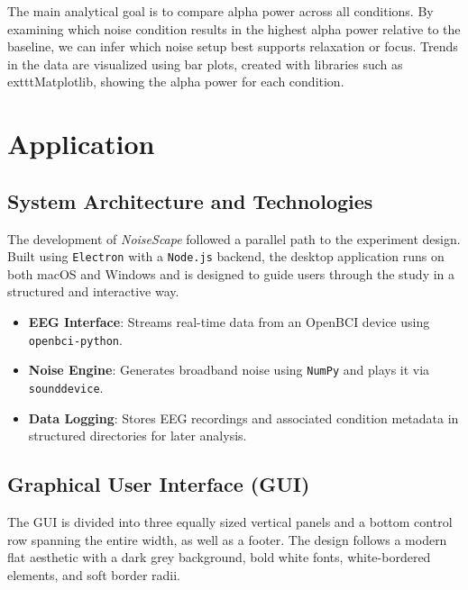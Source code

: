 The main analytical goal is to compare alpha power across all conditions. By examining which noise condition results in the highest alpha power relative to the baseline, we can infer which noise setup best supports relaxation or focus. Trends in the data are visualized using bar plots, created with libraries such as 	exttt{Matplotlib}, showing the alpha power for each condition.






\section{Application}

\subsection{System Architecture and Technologies}

The development of \textit{NoiseScape} followed a parallel path to the experiment design. Built using \texttt{Electron} with a \texttt{Node.js} backend, the desktop application runs on both macOS and Windows and is designed to guide users through the study in a structured and interactive way.

\begin{itemize}
\item \textbf{EEG Interface}: Streams real-time data from an OpenBCI device using \texttt{openbci-python}.
\item \textbf{Noise Engine}: Generates broadband noise using \texttt{NumPy} and plays it via \texttt{sounddevice}.
\item \textbf{Data Logging}: Stores EEG recordings and associated condition metadata in structured directories for later analysis.
\end{itemize}

\subsection{Graphical User Interface (GUI)}

The GUI is divided into three equally sized vertical panels and a bottom control row spanning the entire width, as well as a footer. The design follows a modern flat aesthetic with a dark grey background, bold white fonts, white-bordered elements, and soft border radii.

